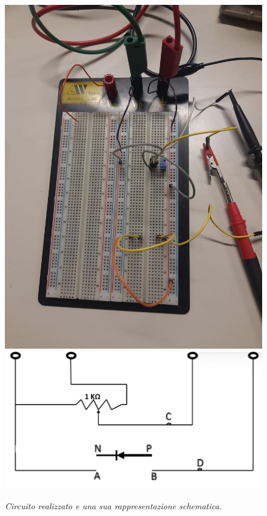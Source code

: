 \documentclass{article}
\begin{document}
\begin{figure}[H]
  \centering
  \includegraphics[scale=0.11]{Diod.jpg}
  \qquad
  \includegraphics[scale=0.55]{Circ1.png}
  \qquad
  \caption{\textit{Circuito realizzato e una sua rappresentazione schematica. }}
\end{figure}
\end{document}
